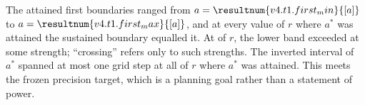 The attained first boundaries ranged from $a=\resultnum{v4.t1.first_min}{[a]}$ to $a=\resultnum{v4.t1.first_max}{[a]}$, and at every value of $r$ where $a^*$ was attained the sustained boundary equalled it. %
At   of $r$, the lower band exceeded  at some strength; ``crossing'' refers only to such strengths. %
The inverted interval of $a^*$ spanned at most one grid step at all   of $r$ where $a^*$ was attained. This meets the frozen precision target, which is a planning goal rather than a statement of power. %

